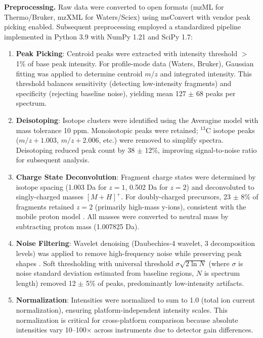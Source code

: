\documentclass[11pt,twocolumn]{article}
\begin{document}
\textbf{Preprocessing.} Raw data were converted to open formats (mzML for Thermo/Bruker, mzXML for Waters/Sciex) using msConvert \cite{chambers2012msconvert} with vendor peak picking enabled. Subsequent preprocessing employed a standardized pipeline implemented in Python 3.9 with NumPy 1.21 and SciPy 1.7:

\begin{enumerate}[leftmargin=*]
    \item \textbf{Peak Picking}: Centroid peaks were extracted with intensity threshold $>$ 1\% of base peak intensity. For profile-mode data (Waters, Bruker), Gaussian fitting was applied to determine centroid $m/z$ and integrated intensity. This threshold balances sensitivity (detecting low-intensity fragments) and specificity (rejecting baseline noise), yielding mean 127 $\pm$ 68 peaks per spectrum.
    
    \item \textbf{Deisotoping}: Isotope clusters were identified using the Averagine model \cite{senko1995averagine} with mass tolerance 10 ppm. Monoisotopic peaks were retained; $^{13}$C isotope peaks ($m/z + 1.003$, $m/z + 2.006$, etc.) were removed to simplify spectra. Deisotoping reduced peak count by 38 $\pm$ 12\%, improving signal-to-noise ratio for subsequent analysis.
    
    \item \textbf{Charge State Deconvolution}: Fragment charge states were determined by isotope spacing (1.003 Da for $z=1$, 0.502 Da for $z=2$) and deconvoluted to singly-charged masses $[M+H]^+$. For doubly-charged precursors, 23 $\pm$ 8\% of fragments retained $z=2$ (primarily high-mass y-ions), consistent with the mobile proton model \cite{wysocki2000mobile}. All masses were converted to neutral mass by subtracting proton mass (1.007825 Da).
    
    \item \textbf{Noise Filtering}: Wavelet denoising (Daubechies-4 wavelet, 3 decomposition levels) was applied to remove high-frequency noise while preserving peak shapes \cite{coombes2005wavelet}. Soft thresholding with universal threshold $\sigma\sqrt{2\ln N}$ (where $\sigma$ is noise standard deviation estimated from baseline regions, $N$ is spectrum length) removed 12 $\pm$ 5\% of peaks, predominantly low-intensity artifacts.
    
    \item \textbf{Normalization}: Intensities were normalized to sum to 1.0 (total ion current normalization), ensuring platform-independent intensity scales. This normalization is critical for cross-platform comparison because absolute intensities vary 10--100× across instruments due to detector gain differences.
\end{enumerate}
\end{document}
